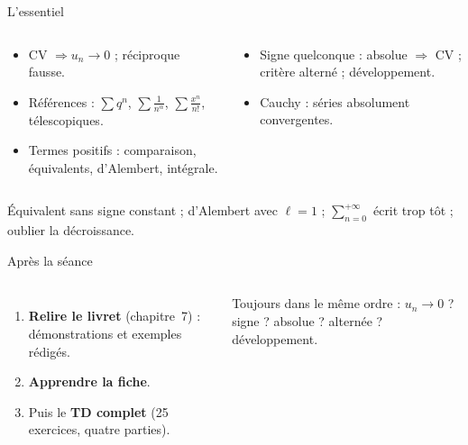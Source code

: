 \documentclass[aspectratio=169,10pt]{beamer}
\begin{document}
\begin{frame}{L'essentiel}
\begin{columns}[T]
\begin{RETENIR}
\begin{itemize}
\item CV $\Rightarrow u_n\to0$ ; réciproque fausse.
\item Références : $\sum q^n$, $\sum\frac1{n^\alpha}$, $\sum\frac{x^n}{n!}$, télescopiques.
\item Termes positifs : comparaison, équivalents, d'Alembert, intégrale.
\end{itemize}
\end{RETENIR}
\begin{RETENIR}
\begin{itemize}
\item Signe quelconque : absolue $\Rightarrow$ CV ; critère alterné ; développement.
\item Cauchy : séries absolument convergentes.
\end{itemize}
\end{RETENIR}
\end{columns}
\begin{PIEGE}
Équivalent sans signe constant ; d'Alembert avec $\ell=1$ ; $\sum_{n=0}^{+\infty}$ écrit trop tôt ; oublier la décroissance.
\end{PIEGE}
\end{frame}

\begin{frame}{Après la séance}
\begin{columns}[T]
\begin{enumerate}
\item \textbf{Relire le livret} (chapitre~7) : démonstrations et exemples rédigés.
\item \textbf{Apprendre la fiche}.
\item Puis le \textbf{TD complet} (25 exercices, quatre parties).
\end{enumerate}
\begin{ASTU}
Toujours dans le même ordre : $u_n\to0$ ? signe ? absolue ? alternée ? développement.
\end{ASTU}
\end{columns}
\end{frame}
\end{document}
